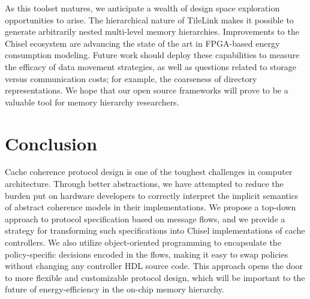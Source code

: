 As this toolset matures, we anticipate a wealth of design space exploration opportunities to arise.
The hierarchical nature of TileLink makes it possible to generate arbitrarily nested multi-level memory hierarchies.
Improvements to the Chisel ecosystem are advancing the state of the art in FPGA-based energy consumption modeling.
Future work should deploy these capabilities to measure the efficacy of data movement strategies,
as well as questions related to storage versus communication costs; for example, the coarseness of directory representations.
We hope that our open source frameworks will prove to be a valuable tool for memory hierarchy researchers.

\section{Conclusion}

Cache coherence protocol design is one of the toughest challenges in computer architecture.
Through better abstractions, we have attempted to reduce the burden put on hardware developers
to correctly interpret the implicit semantics of abstract coherence models in their implementations.
We propose a top-down approach to protocol specification based on message flows, and we provide a strategy
for transforming such specifications into Chisel implementations of cache controllers.
We also utilize object-oriented programming to encapsulate the policy-specific decisions encoded
in the flows, making it easy to swap policies without changing any controller HDL source code.
This approach opens the door to more flexible and customizable protocol design, which will be important
to the future of energy-efficiency in the on-chip memory hierarchy.

